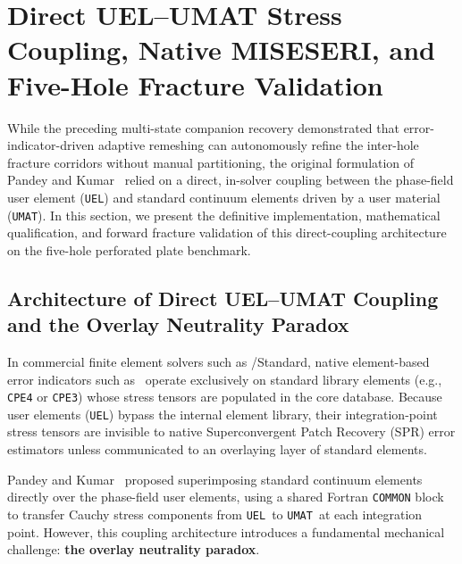 \section{Direct UEL--UMAT Stress Coupling, Native MISESERI, and Five-Hole Fracture Validation}
\label{sec:f1720_direct_coupling_and_validation}

While the preceding multi-state companion recovery demonstrated that error-indicator-driven adaptive remeshing can autonomously refine the inter-hole fracture corridors without manual partitioning, the original formulation of Pandey and Kumar~\cite{pandey2025} relied on a direct, in-solver coupling between the phase-field user element (\texttt{UEL}) and standard continuum elements driven by a user material (\texttt{UMAT}). In this section, we present the definitive implementation, mathematical qualification, and forward fracture validation of this direct-coupling architecture on the five-hole perforated plate benchmark.

\subsection{Architecture of Direct UEL--UMAT Coupling and the Overlay Neutrality Paradox}
\label{subsec:f1720_overlay_neutrality}

In commercial finite element solvers such as \Abaqus/Standard, native element-based error indicators such as \MISESERI\ operate exclusively on standard library elements (e.g., \texttt{CPE4} or \texttt{CPE3}) whose stress tensors are populated in the core database. Because user elements (\texttt{UEL}) bypass the internal element library, their integration-point stress tensors are invisible to native Superconvergent Patch Recovery (SPR) error estimators unless communicated to an overlaying layer of standard elements.

Pandey and Kumar~\cite{pandey2025} proposed superimposing standard continuum elements directly over the phase-field user elements, using a shared Fortran \texttt{COMMON} block to transfer Cauchy stress components from \texttt{UEL}\ to \texttt{UMAT}\ at each integration point. However, this coupling architecture introduces a fundamental mechanical challenge: \textbf{the overlay neutrality paradox}.

